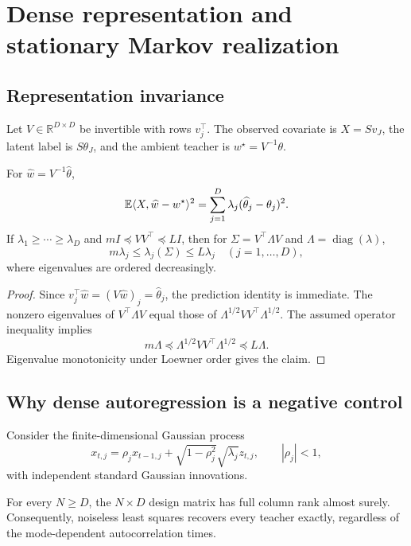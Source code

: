 \section{Dense representation and stationary Markov realization}

\subsection{Representation invariance}
Let $V\in\mathbb R^{D\times D}$ be invertible with rows $v_j^\top$. The
observed covariate is $X=Sv_J$, the latent label is $S\theta_J$, and the ambient
teacher is $w^\star=V^{-1}\theta$.

\begin{proposition}
For $\widehat w=V^{-1}\widehat\theta$,
\[
\mathbb{E}\langle X,\widehat w-w^\star\rangle^2
=\sum_{j=1}^D\lambda_j(\widehat\theta_j-\theta_j)^2.
\]
If $\lambda_1\ge\cdots\ge\lambda_D$ and
$mI\preceq VV^\top\preceq LI$, then for
$\Sigma=V^\top\Lambda V$ and $\Lambda=\operatorname{diag}(\lambda)$,
\[
m\lambda_j\le\lambda_j(\Sigma)\le L\lambda_j
\quad (j=1,\ldots,D),
\]
where eigenvalues are ordered decreasingly.
\end{proposition}

\begin{proof}
Since $v_j^\top\widehat w=(V\widehat w)_j=\widehat\theta_j$, the prediction
identity is immediate. The nonzero eigenvalues of $V^\top\Lambda V$ equal
those of $\Lambda^{1/2}VV^\top\Lambda^{1/2}$. The assumed operator inequality
implies
\[
m\Lambda\preceq\Lambda^{1/2}VV^\top\Lambda^{1/2}\preceq L\Lambda.
\]
Eigenvalue monotonicity under Loewner order gives the claim.
\end{proof}

\subsection{Why dense autoregression is a negative control}
Consider the finite-dimensional Gaussian process
\[
x_{t,j}=\rho_jx_{t-1,j}
+\sqrt{1-\rho_j^2}\sqrt{\lambda_j}z_{t,j},
\qquad |\rho_j|<1,
\]
with independent standard Gaussian innovations.

\begin{proposition}
For every $N\ge D$, the $N\times D$ design matrix has full column rank almost
surely. Consequently, noiseless least squares recovers every teacher exactly,
regardless of the mode-dependent autocorrelation times.
\end{proposition}

